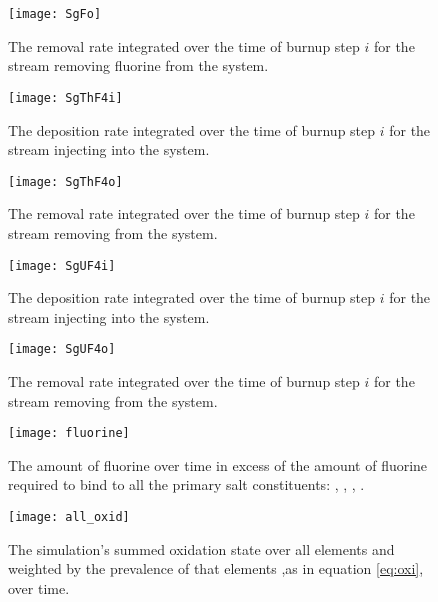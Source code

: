 \begin{figure}[H]
    \centering
    \texttt{[image: SgFo]}
    \caption{The removal rate integrated over the time of burnup step $i$
    for the stream removing fluorine from the system.}
    \label{fig:SgFo}
\end{figure}

\begin{figure}[H]
    \centering
    \texttt{[image: SgThF4i]}
    \caption{The deposition rate integrated over the time of burnup step $i$
    for the stream injecting  into the system.}
    \label{fig:SgThF4i}
\end{figure}

\begin{figure}[H]
    \centering
    \texttt{[image: SgThF4o]}
    \caption{The removal rate integrated over the time of burnup step $i$
    for the stream removing  from the system.}
    \label{fig:SgThF4o}
\end{figure}

\begin{figure}[H]
    \centering
    \texttt{[image: SgUF4i]}
    \caption{The deposition rate integrated over the time of burnup step $i$
    for the stream injecting  into the system.}
    \label{fig:SgUF4i}
\end{figure}

\begin{figure}[H]
    \centering
    \texttt{[image: SgUF4o]}
    \caption{The removal rate integrated over the time of burnup step $i$
    for the stream removing  from the system.}
    \label{fig:SgUF4o}
\end{figure}

\begin{figure}[H]
    \centering
    \texttt{[image: fluorine]}
    \caption{The amount of fluorine over time in excess of the amount of 
    fluorine required to bind to all the primary salt constituents: 
    , , , .}
    \label{fig:fluorine}
\end{figure}

\begin{figure}[H]
    \centering
    \texttt{[image: all\_oxid]}
    \caption{The simulation's summed oxidation state over all elements and
    weighted by the prevalence of that elements ,as in equation \ref{eq:oxi},
    over time.}
    \label{fig:all_oxid}
\end{figure}

